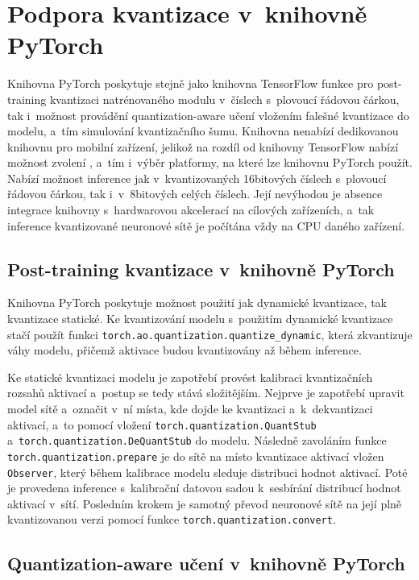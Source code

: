 \section{Podpora kvantizace v~knihovně PyTorch}
\label{section:qat-pytorch}

Knihovna PyTorch poskytuje stejně jako knihovna TensorFlow funkce pro post-training kvantizaci natrénovaného modulu v~číslech s~plovoucí řádovou čárkou, tak i~možnost provádění quantization-aware učení vložením falešné kvantizace do modelu, a~tím simulování kvantizačního šumu. Knihovna nenabízí dedikovanou knihovnu pro mobilní zařízení, jelikož na rozdíl od knihovny TensorFlow nabízí možnost zvolení , a~tím i~výběr platformy, na které lze knihovnu PyTorch použít. Nabízí možnost inference jak v~kvantizovaných 16bitových číslech s~plovoucí řádovou čárkou, tak i~v~8bitových celých číslech. Její nevýhodou je absence integrace knihovny s~hardwarovou akcelerací na cílových zařízeních, a~tak inference kvantizované neuronové sítě je počítána vždy na CPU daného zařízení.  

\subsection{Post-training kvantizace v~knihovně PyTorch}
\label{section:post-training-pytorch}

Knihovna PyTorch poskytuje možnost použití jak dynamické kvantizace, tak kvantizace statické. Ke kvantizování modelu s~použitím dynamické kvantizace stačí použít funkci \verb|torch.ao.quantization.quantize_dynamic|, která zkvantizuje váhy modelu, přičemž aktivace budou kvantizovány až během inference.

Ke statické kvantizaci modelu je zapotřebí provést kalibraci kvantizačních rozsahů aktivací a~postup se tedy stává složitějším. Nejprve je zapotřebí upravit model sítě a~označit v~ní místa, kde dojde ke kvantizaci a~k~dekvantizaci aktivací, a~to pomocí vložení \verb|torch.quantization.QuantStub| a~\verb|torch.quantization.DeQuantStub| do modelu. Následně zavoláním funkce \verb|torch.quantization.prepare| je do sítě na místo kvantizace aktivací vložen \verb|Observer|, který během kalibrace modelu sleduje distribuci hodnot aktivací. Poté je provedena inference s~kalibrační datovou sadou k~sesbírání distribucí hodnot aktivací v~sítí. Posledním krokem je samotný převod neuronové sítě na její plně kvantizovanou verzi pomocí funkce \verb|torch.quantization.convert|.

\subsection{Quantization-aware učení v~knihovně PyTorch}

